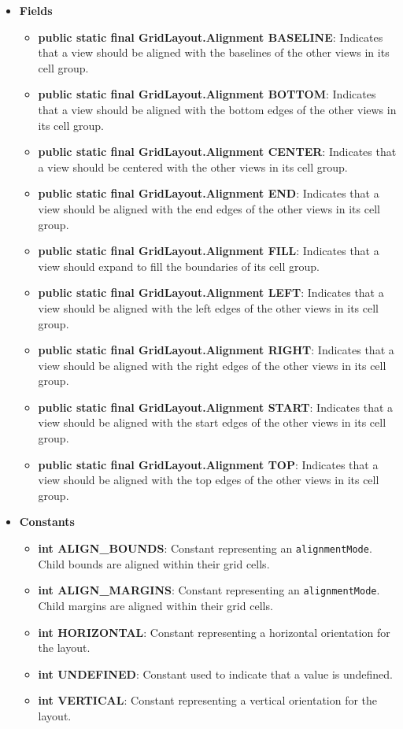 \documentclass{report}
\begin{document}
\begin{itemize}
        \item \textbf{Fields}
            \begin{itemize}
                \item \textbf{public static final GridLayout.Alignment BASELINE}: Indicates that a view should be aligned with the baselines of the other views in its cell group.
                \item \textbf{public static final GridLayout.Alignment BOTTOM}: Indicates that a view should be aligned with the bottom edges of the other views in its cell group.
                \item \textbf{public static final GridLayout.Alignment CENTER}: Indicates that a view should be centered with the other views in its cell group.
                \item \textbf{public static final GridLayout.Alignment END}: Indicates that a view should be aligned with the end edges of the other views in its cell group.
                \item \textbf{public static final GridLayout.Alignment FILL}: Indicates that a view should expand to fill the boundaries of its cell group.
                \item \textbf{public static final GridLayout.Alignment LEFT}: Indicates that a view should be aligned with the left edges of the other views in its cell group.
                \item \textbf{public static final GridLayout.Alignment RIGHT}: Indicates that a view should be aligned with the right edges of the other views in its cell group.
                \item \textbf{public static final GridLayout.Alignment START}: Indicates that a view should be aligned with the start edges of the other views in its cell group.
                \item \textbf{public static final GridLayout.Alignment TOP}: Indicates that a view should be aligned with the top edges of the other views in its cell group.
            \end{itemize}

        \item \textbf{Constants}
            \begin{itemize}
                \item \textbf{int ALIGN\_BOUNDS}: Constant representing an \texttt{alignmentMode}. Child bounds are aligned within their grid cells.
                \item \textbf{int ALIGN\_MARGINS}: Constant representing an \texttt{alignmentMode}. Child margins are aligned within their grid cells.
                \item \textbf{int HORIZONTAL}: Constant representing a horizontal orientation for the layout.
                \item \textbf{int UNDEFINED}: Constant used to indicate that a value is undefined.
                \item \textbf{int VERTICAL}: Constant representing a vertical orientation for the layout.
            \end{itemize}

    \end{itemize}
\end{document}
